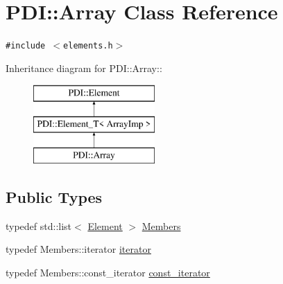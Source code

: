 \hypertarget{class_p_d_i_1_1_array}{
\section{PDI::Array Class Reference}
\label{class_p_d_i_1_1_array}
}
{\tt \#include $<$elements.h$>$}

Inheritance diagram for PDI::Array::\begin{figure}[H]
\begin{center}
\leavevmode
\includegraphics[height=3cm]{class_p_d_i_1_1_array}
\end{center}
\end{figure}
\subsection*{Public Types}
\begin{CompactItemize}
\item 
typedef std::list$<$ \hyperlink{class_p_d_i_1_1_element}{Element} $>$ \hyperlink{class_p_d_i_1_1_array_033a904ed48718f6531f260830e2ed3e}{Members}
\item 
typedef Members::iterator \hyperlink{class_p_d_i_1_1_array_ea216852e304c9b15049c0e595378d1d}{iterator}
\item 
typedef Members::const\_\-iterator \hyperlink{class_p_d_i_1_1_array_3e4335ca32c34f7fd22e00e3aedc3e7f}{const\_\-iterator}
\end{CompactItemize}
